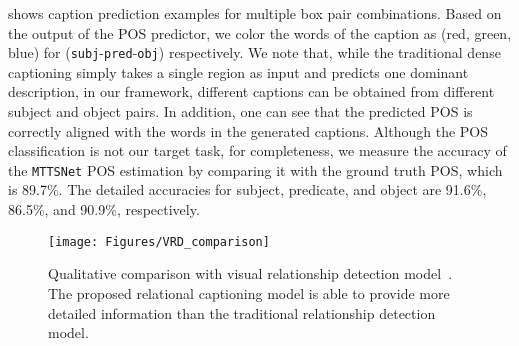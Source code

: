  shows caption prediction examples for multiple box pair combinations. 
{Based on the output of {the} POS predictor, we color the words of the caption as (red, green, blue) for (\texttt{subj}-\texttt{pred}-\texttt{obj}) respectively.}
We note that, while the traditional dense captioning simply takes a single region as input and predicts one dominant description, in 
our framework, different captions can be obtained from different subject and object pairs. 
In addition, one can see that the predicted POS is correctly aligned with the words in the generated captions. 
Although the POS classification is not our target task, for completeness, we measure the accuracy of the \texttt{MTTSNet} POS estimation by comparing it with 
the ground truth POS, which 
is 89.7\%.
{The detailed accuracies for subject, predicate, and object are 91.6\%, 86.5\%, and 90.9\%, respectively.}






\begin{figure*}[t] 
	\vspace{-2mm}
	\centering
	\texttt{[image: Figures/VRD\_comparison]}
	\caption{Qualitative comparison with visual relationship detection model~\cite{lu2016visual}. The proposed relational captioning model is able to provide more detailed information than the traditional relationship detection model.\vspace{-0mm}} 
	\label{fig:VRD_comparison}
\end{figure*}





 








